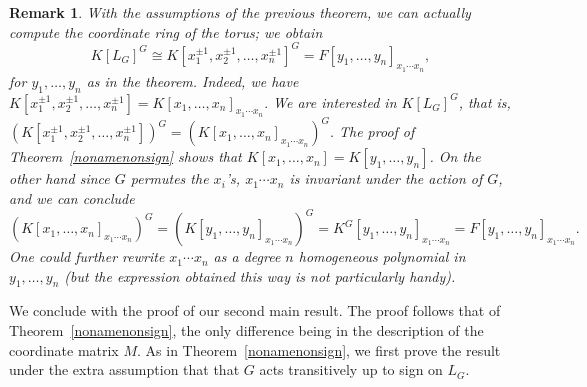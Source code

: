 \documentclass[12pt]{article}
\theoremstyle{plain}
\newtheorem*{remark}{Remark}
\begin{document}
\begin{remark}
With the assumptions of the previous theorem, we can actually compute
the coordinate ring of the torus; we obtain $$K[L_G]^G \cong K[x^{\pm
    1}_1, x^{\pm 1}_2, \ldots , x^{\pm 1}_n]^G = F[y_1, \ldots ,
  y_n]_{x_1\cdots x_n},$$ for $y_1,\dots,y_n$ as in the theorem.
Indeed, we have $K[x^{\pm 1}_1, x^{\pm 1}_2, \ldots , x^{\pm 1}_n] =
K[x_1, \ldots , x_n]_{x_1\cdots x_n}.$ We are interested in
$K[L_G]^G$, that is, $\left( K[x^{\pm 1}_1, x^{\pm 1}_2, \ldots ,
  x^{\pm 1}_n] \right)^G = \left(K[x_1, \ldots , x_n]_{x_1\cdots x_n}
\right) ^G.$ The proof of Theorem~\ref{nonamenonsign} shows that
$K[x_1, \ldots , x_n] = K[y_1, \ldots , y_n]$.  On the other hand
since $G$ permutes the $x_i$'s, $x_1\cdots x_n$ is invariant under the
action of $G$, and we can conclude $$\left( K[x_1, \ldots ,
  x_n]_{x_1\cdots x_n}\right)^G = \left( K[y_1, \ldots ,
  y_n]_{x_1\cdots x_n} \right)^G = K^G [y_1, \ldots , y_n]_{x_1\cdots
  x_n} = F[y_1, \ldots , y_n]_{x_1\cdots x_n}.$$ One could further
rewrite $x_1\cdots x_n$ as a degree $n$ homogeneous polynomial in
$y_1,\dots,y_n$ (but the expression obtained this way is not
particularly handy).
\end{remark}

We conclude with the proof of our second main result.  The proof
follows that of Theorem~\ref{nonamenonsign}, the only difference being in
the description of the coordinate matrix $M$.  As in
Theorem~\ref{nonamenonsign}, we first prove the result under the extra
assumption that that $G$ acts transitively up to sign on $L_G$.
\end{document}
